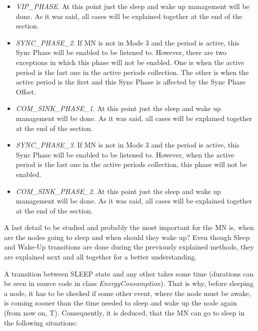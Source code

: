 \begin{itemize}
\begin{itemize}
\begin{itemize}
      \item \textit{VIP\_PHASE}. At this point just the sleep and wake up management will be done. As it was said, all cases will be explained 
      together at the end of the section.

      \item \textit{SYNC\_PHASE\_2}. If \ac{MN} is not in Mode 3 and the period is active, this Sync Phase will be enabled to be listened to. However,
      there are two exceptions in which this phase will not be enabled. One is when the active period is the last one in the active periods collection. 
      The other is when the active period is the first and this Sync Phase is affected by the Sync Phase Offset.

      \item \textit{COM\_SINK\_PHASE\_1}. At this point just the sleep and wake up management will be done. As it was said, all cases will be 
      explained together at the end of the section.

      \item \textit{SYNC\_PHASE\_3}. If \ac{MN} is not in Mode 3 and the period is active, this Sync Phase will be enabled to be listened to. However,
      when the active period is the last one in the active periods collection, this phase will not be enabled.

      \item \textit{COM\_SINK\_PHASE\_2}. At this point just the sleep and wake up management will be done. As it was said, all cases will be 
      explained together at the end of the section.

    \end{itemize}
  \end{itemize}
\end{itemize}

A last detail to be studied and probably the most important for the \ac{MN} is, when are the nodes going to sleep and when should they wake up? 
Even though Sleep and Wake-Up transitions are done during the previously explained methods, they are explained next and all together for a 
better understanding.

A transition between SLEEP state and any other takes some time (durations can be seen in source code in class \textit{EnergyConsumption}). That is why,
before sleeping a node, it has to be checked if some other event, where the node must be awake, is coming sooner than the time needed to sleep and
wake up the node again (from now on, T). Consequently, it is deduced, that the \ac{MN} can go to sleep in the following situations:

